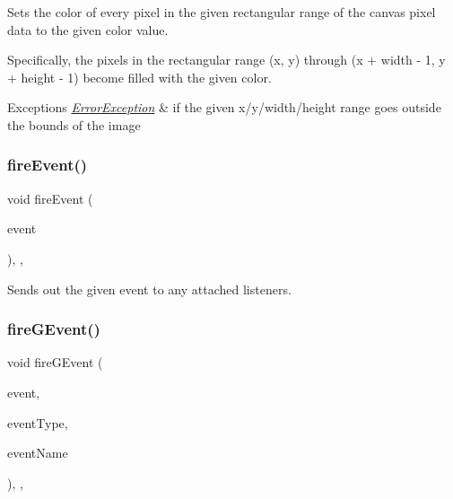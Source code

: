 Sets the color of every pixel in the given rectangular range of the canvas pixel data to the given color value. 

Specifically, the pixels in the rectangular range (x, y) through (x + width -\/ 1, y + height -\/ 1) become filled with the given color. 
\begin{DoxyExceptions}{Exceptions}
{\em \mbox{\hyperlink{classErrorException}{Error\+Exception}}} & if the given x/y/width/height range goes outside the bounds of the image \\
\hline
\end{DoxyExceptions}
\mbox{\label{classGObservable_a63e5e5a6227c59c928493b11aceb0f67}} 
\subsubsection{\texorpdfstring{fire\+Event()}{fireEvent()}}
{\footnotesize\ttfamily void fire\+Event (\begin{DoxyParamCaption}\item[{\mbox{\hyperlink{classGEvent}{G\+Event}} \&}]{event }\end{DoxyParamCaption})\hspace{0.3cm}{\ttfamily [protected]}, {\ttfamily [virtual]}, {\ttfamily [inherited]}}



Sends out the given event to any attached listeners. 

\mbox{\label{classGObservable_ab3983ea07337b52020a29cc00c653d8d}} 
\subsubsection{\texorpdfstring{fire\+G\+Event()}{fireGEvent()}\hspace{0.1cm}{\footnotesize\ttfamily [1/8]}}
{\footnotesize\ttfamily void fire\+G\+Event (\begin{DoxyParamCaption}\item[{Q\+Event $\ast$}]{event,  }\item[{Event\+Type}]{event\+Type,  }\item[{const std\+::string \&}]{event\+Name }\end{DoxyParamCaption})\hspace{0.3cm}{\ttfamily [protected]}, {\ttfamily [virtual]}, {\ttfamily [inherited]}}



